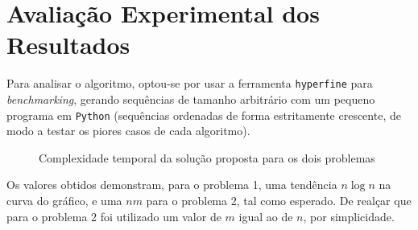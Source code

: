 \documentclass[12pt]{article}
\begin{document}
\section{Avaliação Experimental dos Resultados}
Para analisar o algoritmo, optou-se por usar a ferramenta \texttt{hyperfine} para \textit{benchmarking}, gerando sequências de tamanho arbitrário com um pequeno programa em \texttt{Python} (sequências ordenadas de forma estritamente crescente, de modo a testar os piores casos de cada algoritmo).


\begin{figure}[h]
    \centering
    \qquad
    \caption{Complexidade temporal da solução proposta para os dois problemas}
    \label{fig:test-graph}
\end{figure}
\vspace{0.5mm}

Os valores obtidos demonstram, para o problema 1, uma tendência $n\log{n}$ na curva do gráfico, e uma $nm$ para o problema 2, tal como esperado. De realçar que para o problema 2 foi utilizado um valor de $m$ igual ao de $n$, por simplicidade.
\end{document}
